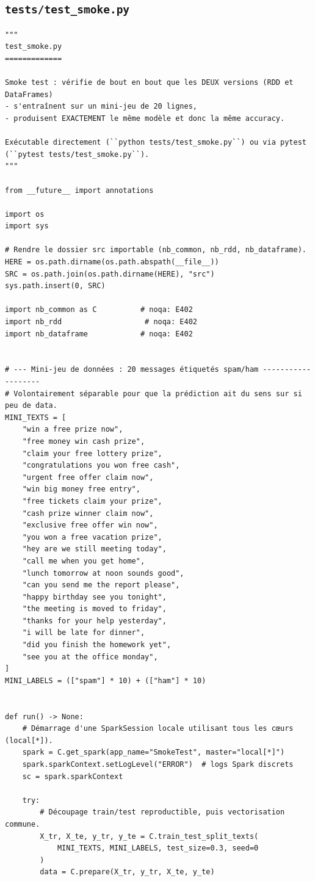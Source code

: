 \subsection{\texttt{tests/test\_smoke.py}}
\begin{lstlisting}[style=py]
"""
test_smoke.py
=============

Smoke test : vérifie de bout en bout que les DEUX versions (RDD et DataFrames)
- s'entraînent sur un mini-jeu de 20 lignes,
- produisent EXACTEMENT le même modèle et donc la même accuracy.

Exécutable directement (``python tests/test_smoke.py``) ou via pytest
(``pytest tests/test_smoke.py``).
"""

from __future__ import annotations

import os
import sys

# Rendre le dossier src importable (nb_common, nb_rdd, nb_dataframe).
HERE = os.path.dirname(os.path.abspath(__file__))
SRC = os.path.join(os.path.dirname(HERE), "src")
sys.path.insert(0, SRC)

import nb_common as C          # noqa: E402
import nb_rdd                   # noqa: E402
import nb_dataframe            # noqa: E402


# --- Mini-jeu de données : 20 messages étiquetés spam/ham -------------------
# Volontairement séparable pour que la prédiction ait du sens sur si peu de data.
MINI_TEXTS = [
    "win a free prize now",
    "free money win cash prize",
    "claim your free lottery prize",
    "congratulations you won free cash",
    "urgent free offer claim now",
    "win big money free entry",
    "free tickets claim your prize",
    "cash prize winner claim now",
    "exclusive free offer win now",
    "you won a free vacation prize",
    "hey are we still meeting today",
    "call me when you get home",
    "lunch tomorrow at noon sounds good",
    "can you send me the report please",
    "happy birthday see you tonight",
    "the meeting is moved to friday",
    "thanks for your help yesterday",
    "i will be late for dinner",
    "did you finish the homework yet",
    "see you at the office monday",
]
MINI_LABELS = (["spam"] * 10) + (["ham"] * 10)


def run() -> None:
    # Démarrage d'une SparkSession locale utilisant tous les cœurs (local[*]).
    spark = C.get_spark(app_name="SmokeTest", master="local[*]")
    spark.sparkContext.setLogLevel("ERROR")  # logs Spark discrets
    sc = spark.sparkContext

    try:
        # Découpage train/test reproductible, puis vectorisation commune.
        X_tr, X_te, y_tr, y_te = C.train_test_split_texts(
            MINI_TEXTS, MINI_LABELS, test_size=0.3, seed=0
        )
        data = C.prepare(X_tr, y_tr, X_te, y_te)


\end{lstlisting}
